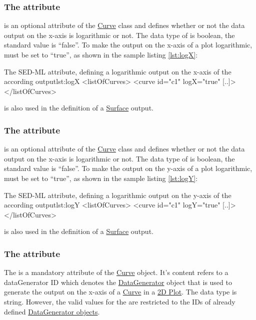 \subsubsection{The  attribute}
\label{sec:logX}
 is an optional attribute of the \hyperref[class:curve]{Curve} class and defines whether or not the data output on the x-axis is logarithmic or not. The data type of  is boolean, the standard value is ``false''.
To make the output on the x-axis of a plot logarithmic,  must be set to ``true'', as shown in the sample listing \ref{lst:logX}: 
\begin{myXmlLst}{The SED-ML   attribute, defining a logarithmic output on the x-axis of the according output}{lst:logX}
<listOfCurves>
  <curve id="c1"  logX="true" [..]>
</listOfCurves>
\end{myXmlLst}
 is also used in the definition of a \hyperref[class:surface]{Surface} output.

\subsubsection{The  attribute}
\label{sec:logY}
 is an optional attribute of the \hyperref[class:curve]{Curve} class and defines whether or not the data output on the x-axis is logarithmic or not. The data type of  is boolean, the standard value is ``false''.
To make the output on the y-axis of a plot logarithmic,  must be set to ``true'', as shown in the sample listing \ref{lst:logY}: 
\begin{myXmlLst}{The SED-ML  attribute, defining a logarithmic output on the y-axis of the according output}{lst:logY}
<listOfCurves>
  <curve id="c1"  logY="true" [..]>
</listOfCurves>
\end{myXmlLst}
 is also used in the definition of a \hyperref[class:surface]{Surface} output.

\subsubsection{The  attribute}
\label{sec:xDataReference}
The  is a mandatory attribute of the \hyperref[class:curve]{Curve} object. It's content refers to a dataGenerator ID which denotes the \hyperref[class:dataGenerator]{DataGenerator} object that is used to generate the output on the x-axis of a \hyperref[class:curve]{Curve} in a \hyperref[class:plot2D]{2D Plot}. 
The  data type is string. However, the valid values for the  are restricted to the IDs of already defined \hyperref[class:dataGenerator]{DataGenerator objects}.

